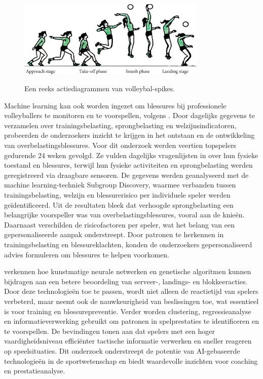 \begin{figure}
  \centering
  \includegraphics[width=0.8\textwidth]{img/spike.jpg}
  \caption{\label{fig:spike}Een reeks actiediagrammen van volleybal-spikes.}
  \autocite{Dai2021}
\end{figure}

Machine learning kan ook worden ingezet om blessures bij professionele volleyballers te monitoren en te voorspellen, volgens \textcite{Leeuw2021}. Door dagelijks gegevens te verzamelen over trainingsbelasting, sprongbelasting en welzijnsindicatoren, probeerden de onderzoekers inzicht te krijgen in het ontstaan en de ontwikkeling van overbelastingsblessures.
Voor dit onderzoek werden veertien topspelers gedurende 24 weken gevolgd. Ze vulden dagelijks vragenlijsten in over hun fysieke toestand en blessures, terwijl hun fysieke activiteiten en sprongbelasting werden geregistreerd via draagbare sensoren. De gegevens werden geanalyseerd met de machine learning-techniek Subgroup Discovery, waarmee verbanden tussen trainingsbelasting, welzijn en blessurerisico per individuele speler werden geïdentificeerd.
Uit de resultaten bleek dat verhoogde sprongbelasting een belangrijke voorspeller was van overbelastingsblessures, vooral aan de knieën. Daarnaast verschilden de risicofactoren per speler, wat het belang van een gepersonaliseerde aanpak onderstreept. Door patronen te herkennen in trainingsbelasting en blessureklachten, konden de onderzoekers gepersonaliseerd advies formuleren om blessures te helpen voorkomen.

\textcite{Yu2022} verkennen hoe kunstmatige neurale netwerken en genetische algoritmen kunnen bijdragen aan een betere beoordeling van serveer-, landings- en blokkeeracties. Door deze technologieën toe te passen, wordt niet alleen de reactietijd van spelers verbeterd, maar neemt ook de nauwkeurigheid van beslissingen toe, wat essentieel is voor training en blessurepreventie.
Verder worden clustering, regressieanalyse en informatieverwerking gebruikt om patronen in spelprestaties te identificeren en te voorspellen. De bevindingen tonen aan dat spelers met een hoger vaardigheidsniveau efficiënter tactische informatie verwerken en sneller reageren op speelsituaties. Dit onderzoek onderstreept de potentie van AI-gebaseerde technologieën in de sportwetenschap en biedt waardevolle inzichten voor coaching en prestatieanalyse.

